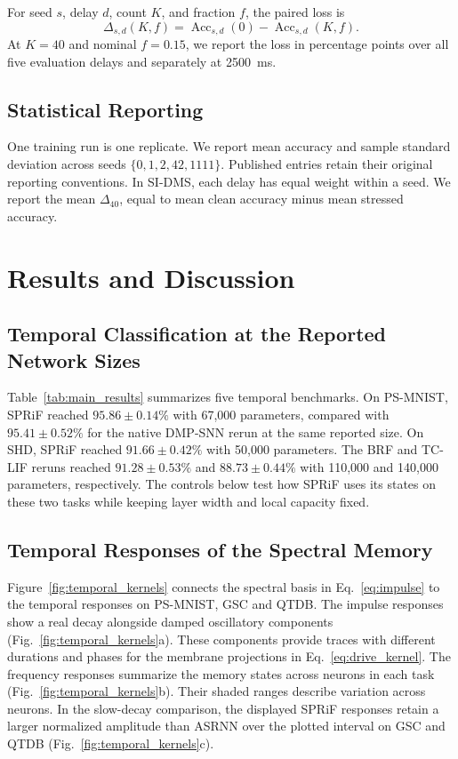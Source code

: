 \documentclass[letterpaper,journal]{IEEEtran}
\DeclareMathOperator{\Acc}{Acc}
\begin{document}
For seed $s$, delay $d$, count $K$, and fraction $f$, the paired loss is
\begin{equation}
\Delta_{s,d}(K,f)=
\Acc_{s,d}(0)-\Acc_{s,d}(K,f).
\label{eq:paired_loss}
\end{equation}
At $K=40$ and nominal $f=0.15$, we report the loss in percentage points over all five evaluation delays and separately at 2500~ms.

\subsection{Statistical Reporting}
\label{sec:statistics}

One training run is one replicate. We report mean accuracy and sample standard deviation across seeds $\{0,1,2,42,1111\}$. Published entries retain their original reporting conventions. In SI-DMS, each delay has equal weight within a seed. We report the mean $\Delta_{40}$, equal to mean clean accuracy minus mean stressed accuracy.

\section{Results and Discussion}
\label{sec:results}

\subsection{Temporal Classification at the Reported Network Sizes}

Table~\ref{tab:main_results} summarizes five temporal benchmarks. On PS-MNIST, SPRiF reached $95.86\pm0.14\%$ with 67,000 parameters, compared with $95.41\pm0.52\%$ for the native DMP-SNN rerun at the same reported size. On SHD, SPRiF reached $91.66\pm0.42\%$ with 50,000 parameters. The BRF and TC-LIF reruns reached $91.28\pm0.53\%$ and $88.73\pm0.44\%$ with 110,000 and 140,000 parameters, respectively. The controls below test how SPRiF uses its states on these two tasks while keeping layer width and local capacity fixed.

\subsection{Temporal Responses of the Spectral Memory}
\label{sec:temporal_responses}

Figure~\ref{fig:temporal_kernels} connects the spectral basis in Eq.~\eqref{eq:impulse} to the temporal responses on PS-MNIST, GSC and QTDB. The impulse responses show a real decay alongside damped oscillatory components (Fig.~\ref{fig:temporal_kernels}a). These components provide traces with different durations and phases for the membrane projections in Eq.~\eqref{eq:drive_kernel}. The frequency responses summarize the memory states across neurons in each task (Fig.~\ref{fig:temporal_kernels}b). Their shaded ranges describe variation across neurons. In the slow-decay comparison, the displayed SPRiF responses retain a larger normalized amplitude than ASRNN over the plotted interval on GSC and QTDB (Fig.~\ref{fig:temporal_kernels}c).
\end{document}

